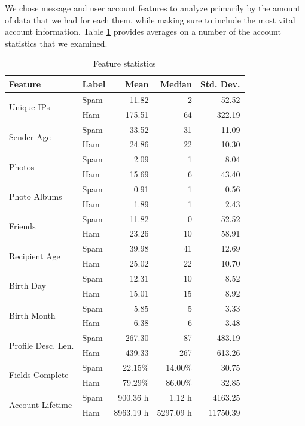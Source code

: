 \documentclass[preprint]{acm_proc_article-sp}
\begin{document}
We chose message and user account features to analyze primarily by the amount of data that we had for each them, while making sure to include the most vital account information. Table \ref{tab:feats} provides averages on a number of the account statistics that we examined. 
\begin{table}
\begin{tabular}{|l|l|r|r|r|}
    \hline
    \textbf{Feature} & \textbf{Label} & \textbf{Mean} & \textbf{Median} & \textbf{Std. Dev.}\\
    \hline
    \multirow{2}{*}{Unique IPs} & Spam & 11.82 & 2 & 52.52\\
    & Ham & 175.51 & 64 & 322.19\\
    \hline
    \multirow{2}{*}{Sender Age} & Spam & 33.52 & 31 & 11.09\\
    & Ham & 24.86 & 22 & 10.30\\
    \hline
    \multirow{2}{*}{Photos} & Spam & 2.09 & 1 & 8.04\\
    & Ham & 15.69 & 6 & 43.40\\
    \hline
    \multirow{2}{*}{Photo Albums} & Spam & 0.91 & 1 & 0.56\\
    & Ham & 1.89 & 1 & 2.43\\
    \hline
    \multirow{2}{*}{Friends} & Spam & 11.82 & 0 & 52.52\\
    & Ham & 23.26 & 10 & 58.91\\
    \hline
    \multirow{2}{*}{Recipient Age} & Spam & 39.98 & 41 & 12.69\\
    & Ham & 25.02 & 22 & 10.70\\
    \hline
    \multirow{2}{*}{Birth Day} & Spam & 12.31 & 10 & 8.52\\
    & Ham & 15.01 & 15 & 8.92\\
    \hline
    \multirow{2}{*}{Birth Month} & Spam & 5.85 & 5 & 3.33\\
    & Ham & 6.38 & 6 & 3.48\\
    \hline
    \multirow{2}{*}{Profile Desc. Len.} & Spam & 267.30 & 87 & 483.19\\
    & Ham & 439.33 & 267 & 613.26\\
    \hline
    \multirow{2}{*}{Fields Complete} & Spam & 22.15\% & 14.00\% & 30.75\\
    & Ham & 79.29\% & 86.00\% & 32.85\\
    \hline
    \multirow{2}{*}{Account Lifetime} & Spam & 900.36 h & 1.12 h & 4163.25\\
    & Ham & 8963.19 h & 5297.09 h & 11750.39 \\
    \hline
\end{tabular}
\caption{Feature statistics}
\label{tab:feats}
\end{table}
\end{document}
